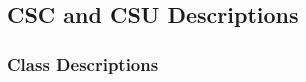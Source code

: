 \documentclass{article}
\begin{document}
\pagebreak
\subsection{CSC and CSU Descriptions}



\subsubsection{Class Descriptions}
\label{cd}

\end{document}

